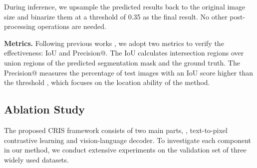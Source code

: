 \documentclass[10pt,twocolumn,letterpaper]{article}
\begin{document}
During inference, we upsample the predicted results back to the original image size and binarize them at a threshold of 0.35 as the final result.
No other post-processing operations are needed.

\textbf{Metrics.}
Following previous works \cite{ding2021vlt,liu2017recurrent,li2018referring,margffoy2018dynamic},
we adopt two metrics to verify the effectiveness: IoU and Precision@.
The IoU calculates intersection regions over union regions of the predicted segmentation mask and the ground truth.
The Precision@ measures the percentage of test images with an IoU score higher than the threshold , which focuses on the location ability of the method.

\subsection{Ablation Study}
The proposed CRIS framework consists of two main parts, \ie, text-to-pixel contrastive learning and vision-language decoder.
To investigate each component in our method, we conduct extensive experiments on the validation set of three widely used datasets.
\end{document}
